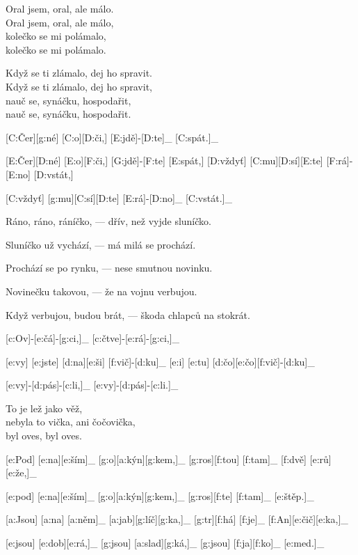 Oral jsem, oral, ale málo.\\
Oral jsem, oral, ale málo,\\
kolečko se mi polámalo,\\
kolečko se mi polámalo.

Když se ti zlámalo, dej ho spravit.\\
Když se ti zlámalo, dej ho spravit,\\
nauč se, synáčku, hospodařit,\\
nauč se, synáčku, hospodařit.



[C:Čer][g:né] [C:o][D:či,] [E:jdě]-[D:te]_ [C:spát.]_

[E:Čer][D:né] [E:o][F:či,] [G:jdě]-[F:te] [E:spát,] %
[D:vždyť] [C:mu][D:sí][E:te] [F:rá]-[E:no] [D:vstát,]

[C:vždyť] [g:mu][C:sí][D:te] [E:rá]-[D:no]_ [C:vstát.]_

Ráno, ráno, ráníčko, --- dřív, než vyjde sluníčko.

Sluníčko už vychází, --- má milá se prochází.

Prochází se po rynku, --- nese smutnou novinku.

Novinečku takovou, --- že na vojnu verbujou.

Když verbujou, budou brát, --- škoda chlapců na stokrát.



[c:Ov]-[e:čá]-[g:ci,]_
[c:čtve]-[e:rá]-[g:ci,]_

[e:vy] [e:jste] [d:na][e:ši] [f:vič]-[d:ku]_
[e:i] [e:tu] [d:čo][e:čo][f:vič]-[d:ku]_

[e:vy]-[d:pás]-[c:li,]_
[e:vy]-[d:pás]-[c:li.]_

To je lež jako věž,\\
nebyla to vička, ani čočovička,\\
byl oves, byl oves.



[e:Pod] [e:na][e:ším]_ [g:o][a:kýn][g:kem,]_
[g:ros][f:tou] [f:tam]_ [f:dvě] [e:rů][e:že,]_

[e:pod] [e:na][e:ším]_ [g:o][a:kýn][g:kem,]_
[g:ros][f:te] [f:tam]_ [e:štěp.]_

[a:Jsou] [a:na] [a:něm]_ [a:jab][g:líč][g:ka,]_
[g:tr][f:há] [f:je]_ [f:An][e:čič][e:ka,]_

[e:jsou] [e:dob][e:rá,]_ [g:jsou] [a:slad][g:ká,]_
[g:jsou] [f:ja][f:ko]_ [e:med.]_



